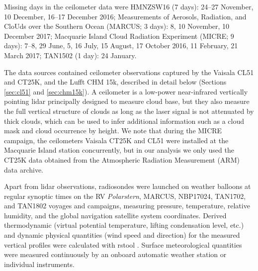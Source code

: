 \documentclass[12pt,a4paper]{article}
\begin{document}
Missing days in the ceilometer data were HMNZSW16 (7 days): 24--27 November, 10
December, 16--17 December 2016; Measurements of Aerosols, Radiation, and CloUds
over the Southern Ocean (MARCUS;  3 days): 8, 10 November, 10 December 2017;
Macquarie Island Cloud Radiation Experiment (MICRE; 9 days): 7--8, 29 June, 5,
16 July, 15 August, 17 October 2016, 11 February, 21 March 2017; TAN1502 (1
day): 24 January.

The data sources contained ceilometer observations captured by the Vaisala CL51
and CT25K, and the Lufft CHM 15k, described in detail below (Sections
\ref{sec:cl51} and \ref{sec:chm15k}). A ceilometer is a low-power near-infrared
vertically pointing lidar principally designed to measure cloud base, but they
also measure the full vertical structure of clouds as long as the laser signal
is not attenuated by thick clouds, which can be used to infer additional
information such as a cloud mask and cloud occurrence by height.  We note that
during the MICRE campaign, the ceilometers Vaisala CT25K and CL51 were
installed at the Macquarie Island station concurrently, but in our analysis we
only used the CT25K data obtained from the Atmospheric Radiation Measurement
(ARM) data archive.

Apart from lidar observations, radiosondes were launched on weather balloons at
regular synoptic times on the RV \emph{Polarstern}, MARCUS, NBP17024, TAN1702,
and TAN1802 voyages and campaigns, measuring pressure, temperature, relative
humidity, and the global navigation satellite system coordinates. Derived
thermodynamic (virtual potential temperature, lifting condensation level, etc.)
and dynamic physical quantities (wind speed and direction) for the measured
vertical profiles were calculated with rstool \citep{rstool}. Surface
meteorological quantities were measured continuously by an onboard automatic
weather station or individual instruments.
\end{document}
